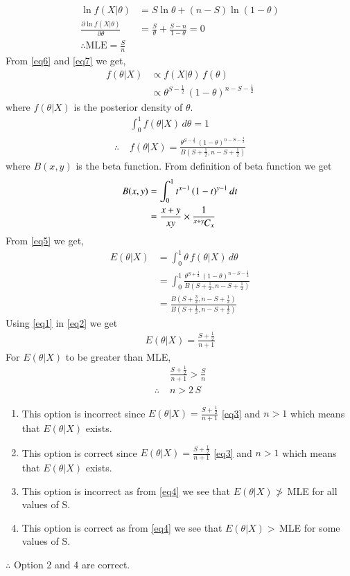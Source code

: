 \documentclass[journal,12pt,twocolumn]{IEEEtran}
\begin{document}
\begin{align}
    \ln{f(X|\theta)} &= S\ln{\theta} + (n-S)\ln{(1-\theta)}\\
    \frac{\partial \ln{f(X|\theta)}}{\partial \theta} &= \frac{S}{\theta} + \frac{S-n}{1-\theta} = 0 \nonumber\\
     \therefore \text{MLE} = \frac{S}{n}
\end{align}
From \eqref{eq6} and \eqref{eq7} we get,
\begin{align}
    f(\theta|X) &\propto f(X|\theta)\, f(\theta)\nonumber\\
    &\propto \theta^{S-\frac{1}{2}}\,(1-\theta)^{n-S-\frac{1}{2}}
\end{align}
where $f(\theta|X)$ is the posterior density of $\theta$.
\begin{align}
    &\int_0^1 f(\theta|X)\,d\theta = 1\nonumber\\
    \therefore\; &f(\theta|X) = \frac{\theta^{S-\frac{1}{2}}\,(1-\theta)^{n-S-\frac{1}{2}}}{B(S+\frac{1}{2},n-S+\frac{1}{2})}
\end{align}
where $B(x,y)$ is the beta function. From definition of beta function we get
\begin{align}
    B(x,y) &= \int_0^1 t^{x-1}\,(1-t)^{y-1}\,dt\nonumber\\
    &= \frac{x+y}{xy}\times \frac{1}{{{}^{x+y}\mkern-1muC_{x}}}\label{eq1}
\end{align}
From \eqref{eq5} we get,
\begin{align}
    E(\theta|X) &= \int_0^1 \theta\,f(\theta|X)\,d\theta\nonumber\\
    &=\int_0^1 \frac{\theta^{S+\frac{1}{2}}\,(1-\theta)^{n-S-\frac{1}{2}}}{B(S+\frac{1}{2},n-S+\frac{1}{2})}\nonumber\\
    &=\frac{B(S+\frac{3}{2},n-S+\frac{1}{2})}{B(S+\frac{1}{2},n-S+\frac{1}{2})}\label{eq2}
\end{align}
Using \eqref{eq1} in \eqref{eq2} we get
\begin{align}
    E(\theta|X) = \frac{S+\frac{1}{2}}{n+1}\label{eq3}
\end{align}
For $E(\theta|X)$ to be greater than MLE,
\begin{align}
    &\frac{S+\frac{1}{2}}{n+1} > \frac{S}{n}\nonumber\\
     \therefore\;&n>2\,S\label{eq4}
\end{align}
\begin{enumerate}
    \item This option is incorrect since $E(\theta|X) = \frac{S+\frac{1}{2}}{n+1}$ \eqref{eq3} and $n>1$ which means that $E(\theta|X)$ exists.
    \item This option is correct since $E(\theta|X) = \frac{S+\frac{1}{2}}{n+1}$ \eqref{eq3} and $n>1$ which means that $E(\theta|X)$ exists.
    \item This option is incorrect as from \eqref{eq4} we see that $E(\theta|X)\ngtr\, $MLE for all values of S.
    \item This option is correct as from \eqref{eq4} we see that $E(\theta|X)>\, $MLE for some values of S.
\end{enumerate}
$\therefore$ Option 2 and 4 are correct.\\
\end{document}
